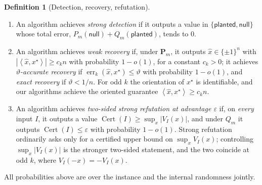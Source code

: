 \documentclass[11pt]{article}
\theoremstyle{definition}
\newtheorem{definition}[definition]{Definition}
\theoremstyle{remark}
\newcommand{\1}{\mathbf 1}
\newcommand{\eps}{\varepsilon}
\newcommand{\xstar}{{x^\star}}
\newcommand{\ip}[2]{\left\langle #1,#2\right\rangle}
\DeclareMathOperator{\Cert}{Cert}
\DeclareMathOperator{\err}{err}
\numberwithin{equation}{section}
\begin{document}
\begin{definition}[Detection, recovery, refutation]\label{def:tasks}
\begin{enumerate}
\item An algorithm achieves \emph{strong detection} if it outputs a value
in $\{\textsf{planted},\textsf{null}\}$ whose total error,
$P_m(\textsf{null})+Q_m(\textsf{planted})$, tends to $0$.
\item An algorithm achieves \emph{weak recovery} if, under
$\mathbf P_m$, it outputs $\widehat x\in\{\pm1\}^n$ with
$|\ip{\widehat x}{\xstar}|\ge c_kn$ with probability $1-o(1)$, for a
constant $c_k>0$; it achieves \emph{$\vartheta$-accurate recovery} if
$\err_k(\widehat x,\xstar)\le\vartheta$ with probability $1-o(1)$, and
\emph{exact recovery} if $\vartheta<1/n$.  For odd $k$ the orientation
of $\xstar$ is identifiable, and our algorithms achieve the oriented
guarantee $\ip{\widehat x}{\xstar}\ge c_kn$.
\item An algorithm achieves \emph{two-sided strong refutation at
advantage $\eps$} if, on \emph{every} input $I$, it outputs a value
$\Cert(I)\ge\sup_x|V_I(x)|$, and under $Q_m$ it outputs
$\Cert(I)\le\eps$ with probability $1-o(1)$.  Strong refutation
ordinarily asks only for a certified upper bound on $\sup_xV_I(x)$;
controlling $\sup_x|V_I(x)|$ is the stronger two-sided statement, and
the two coincide at odd $k$, where $V_I(-x)=-V_I(x)$.
\end{enumerate}
All probabilities above are over the instance
and the internal randomness jointly.  %
\end{definition}
\end{document}
